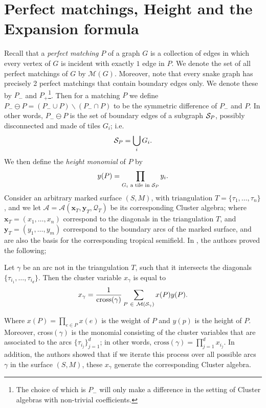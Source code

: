 \section{Perfect matchings, Height and the Expansion formula}
Recall that a \emph{perfect matching} $P$ of a graph $G$ is a collection of edges in which every vertex of $G$ is incident with exactly $1$ edge in $P$. We denote the set of all perfect matchings of $G$ by $\mathcal{M}(G)$. Moreover, note that every snake graph has precisely 2 perfect matchings that contain boundary edges only. We denote these by $P_-$ and $P_+$\footnote{The choice of which is $P_-$ will only make a difference in the setting of Cluster algebras with non-trivial coefficients.}. Then for a matching $P$ we define $P_-\ominus P = (P_- \cup P)\backslash(P_- \cap P)$ to be the symmetric difference of $P_-$ and $P$. In other words, $P_-\ominus P $ is the set of boundary edges of a subgraph $\mathcal{S}_P$, possibly disconnected and made of tiles $G_i$; i.e. 
\begin{equation*}
    \mathcal{S}_P = \bigcup_{i} G_i.
\end{equation*}
We then define the \emph{height monomial} of $P$ by 
\begin{equation*}
    y(P) = \prod_{G_i \text{ a tile in } \mathcal{S}_P}y_i.
\end{equation*}
Consider an arbitrary marked surface $(S,M)$, with triangulation $T = \{\tau_1,\dots,\tau_n\}$, and we let $\mathcal{A} = \mathcal{A}(\mathbf{x}_T,\mathbf{y}_T,\mathcal{Q}_T)$ be its corresponding Cluster algebra; where $\mathbf{x}_T=(x_1,\dots,x_n)$ correspond to the diagonals in the triangulation $T$, and $\mathbf{y}_T = (y_1,\dots,y_m)$ correspond to the boundary arcs of the marked surface, and are also the basis for the corresponding tropical semifield. In  \cite{MSW}, the authors proved the following;
\begin{theorem}
    Let $\gamma$ be an arc not in the triangulation $T$, such that it intersects the diagonals $\{\tau_{i_1},\dots,\tau_{i_d}\}$. Then the cluster variable $x_{\gamma}$ is equal to 
    \begin{equation}\label{ExpansionFormula}
        x_{\gamma} = \dfrac{1}{\text{cross}(\gamma)} \sum_{P \ \in \ \mathcal{M}(\s_{\gamma})} x(P)y(P).
    \end{equation} 
\end{theorem}
Where $x(P) = \prod_{e \in P}x(e)$ is the weight of $P$ and $y(p)$ is the height of $P$. Moreover, cross$(\gamma)$ is the monomial consisting of the cluster variables that are associated to the arcs $\{\tau_{i_j}\}_{j = 1}^d$; in other words, $\text{cross}(\gamma) = \prod_{j = 1}^dx_{i_j}$. In addition, the authors showed that if we iterate this process over all possible arcs $\gamma$ in the surface $(S,M)$, these $x_{\gamma}$ generate the corresponding Cluster algebra.

